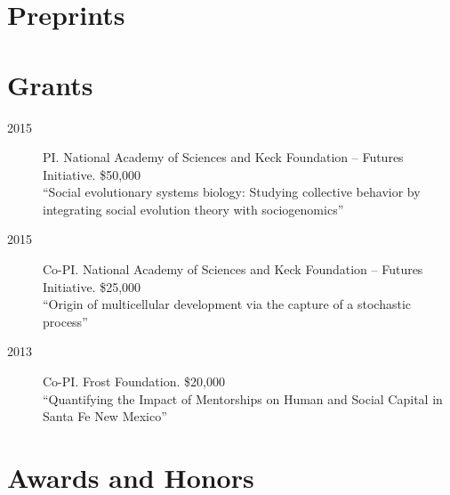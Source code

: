 \documentclass[11pt]{article}
\begin{document}
  \begin{publist}
    
    
    
  \end{publist}
  
  \section{Preprints}
  
  \begin{publist}
    
  \item {}
    
  \item {}
    
  \end{publist}
  


%     
    


  \section{Grants}
  \begin{description}
  \item[2015] PI. National Academy of Sciences and Keck Foundation -- Futures Initiative. \$50,000\\
    ``Social evolutionary systems biology: Studying collective behavior by integrating social evolution theory with sociogenomics''
  \item[2015] Co-PI. National Academy of Sciences and Keck Foundation -- Futures Initiative. \$25,000\\
    ``Origin of multicellular development via the capture of a stochastic process''
  \item[2013] Co-PI. Frost Foundation. \$20,000 \\
    ``Quantifying the Impact of Mentorships on Human and Social Capital in Santa Fe New Mexico''
  \end{description}
  
  \section{Awards and Honors}
\end{document}

